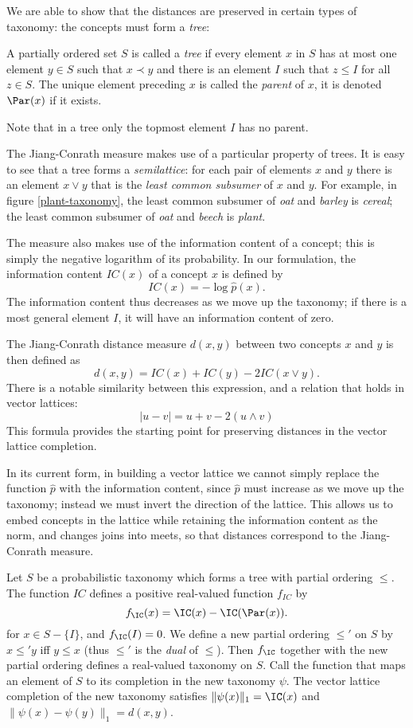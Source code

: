 We are able to show that the distances are preserved in certain types of taxonomy: the concepts must form a \emph{tree}:
\begin{defn}[Trees]
A partially ordered set $S$ is called a \emph{tree} if every element $x$ in $S$ has at most one element $y\in S$ such that $x \prec y$ and there is an element $I$ such that $z \le I$ for all $z \in S$. The unique element preceding $x$ is called the \emph{parent} of $x$, it is denoted $\Par(x)$ if it exists.
\end{defn}
Note that in a tree only the topmost element $I$ has no parent.

The Jiang-Conrath measure makes use of a particular property of trees. It is easy to see that a tree forms a \emph{semilattice}: for each pair of elements $x$ and $y$ there is an element $x \lor y$ that is the \emph{least common subsumer} of $x$ and $y$. For example, in figure \ref{plant-taxonomy}, the least common subsumer of \emph{oat} and \emph{barley} is \emph{cereal}; the least common subsumer of \emph{oat} and \emph{beech} is \emph{plant}.

The measure also makes use of the information content of a concept; this is simply the negative logarithm of its probability. In our formulation, the information content $\mathit{IC}(x)$ of a concept $x$ is defined by
$$\mathit{IC}(x) = -\log \hat{p}(x).$$
The information content thus decreases as we move up the taxonomy; if there is a most general element $I$, it will have an information content of zero.

The Jiang-Conrath distance measure $d(x,y)$ between two concepts $x$ and $y$ is then defined as
$$d(x,y) = \mathit{IC}(x) + \mathit{IC}(y) - 2\mathit{IC}(x\lor y).$$
There is a notable similarity between this expression, and a relation that holds in vector lattices:
$$|u - v| = u + v - 2(u\land v)$$
This formula provides the starting point for preserving distances in the vector lattice completion.

In its current form, in building a vector lattice we cannot simply replace the function $\hat{p}$ with the information content, since $\hat{p}$ must increase as we move up the taxonomy; instead we must invert the direction of the lattice. This allows us to embed concepts in the lattice while retaining the information content as the norm, and changes joins into meets, so that distances correspond to the Jiang-Conrath measure.
\begin{prop}
Let $S$ be a probabilistic taxonomy which forms a tree with partial ordering $\le$. The function $\mathit{IC}$ defines a positive real-valued function $f_\mathit{IC}$ by
$$f_\IC(x) = \IC(x) - \IC(\Par(x)).$$
for $x \in S - \{I\}$, and $f_\IC(I) = 0$. We define a new partial ordering $\le'$ on $S$ by $x \le' y$ iff $y \le x$ (thus $\le'$ is the \emph{dual} of $\le$). Then $f_\IC$ together with the new partial ordering defines a real-valued taxonomy on $S$. Call the function that maps an element of $S$ to its completion in the new taxonomy $\psi$. The vector lattice completion of the new taxonomy satisfies $\|\psi(x)\|_1 = \IC(x)$ and $\|\psi(x) - \psi(y)\|_1 = d(x,y)$. 
\end{prop}

